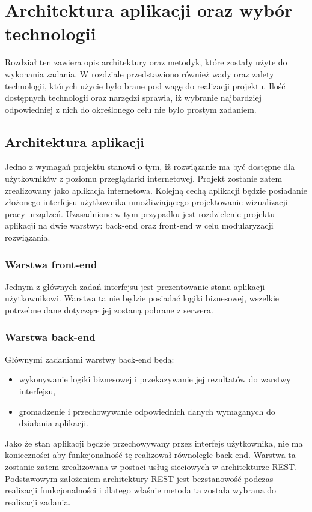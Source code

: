 \chapter{Architektura aplikacji oraz wybór technologii}

Rozdział ten zawiera opis architektury oraz metodyk, które zostały użyte do wykonania zadania. W rozdziale przedstawiono również wady oraz zalety technologii, których użycie było brane pod wagę do realizacji projektu. Ilość dostępnych technologii oraz narzędzi sprawia, iż wybranie najbardziej odpowiedniej z nich do określonego celu nie było prostym zadaniem.

\section{Architektura aplikacji}
Jedno z wymagań projektu stanowi o tym, iż rozwiązanie ma być dostępne dla użytkowników z poziomu przeglądarki internetowej. Projekt zostanie zatem zrealizowany jako aplikacja internetowa. Kolejną cechą aplikacji będzie posiadanie złożonego interfejsu użytkownika umożliwiającego projektowanie wizualizacji pracy urządzeń. Uzasadnione w tym przypadku jest rozdzielenie projektu aplikacji na dwie warstwy: back-end oraz front-end w celu modularyzacji rozwiązania. 

\subsection{Warstwa front-end}
Jednym z głównych zadań interfejsu jest prezentowanie stanu aplikacji użytkownikowi. Warstwa ta nie będzie posiadać logiki biznesowej, wszelkie potrzebne dane dotyczące jej zostaną pobrane z serwera.

\subsection{Warstwa back-end}
Głównymi zadaniami warstwy back-end będą:
\begin{itemize}
\item wykonywanie logiki biznesowej i przekazywanie jej rezultatów do warstwy interfejsu,
\item gromadzenie i przechowywanie odpowiednich danych wymaganych do działania aplikacji.
\end{itemize}

Jako że stan aplikacji będzie przechowywany przez interfejs użytkownika, nie ma konieczności aby funkcjonalność tę realizował równolegle back-end. Warstwa ta zostanie zatem zrealizowana w postaci usług sieciowych w architekturze REST. Podstawowym założeniem architektury REST jest bezstanowość podczas realizacji funkcjonalności\cite{rest-book} i dlatego właśnie metoda ta została wybrana do realizacji zadania.

